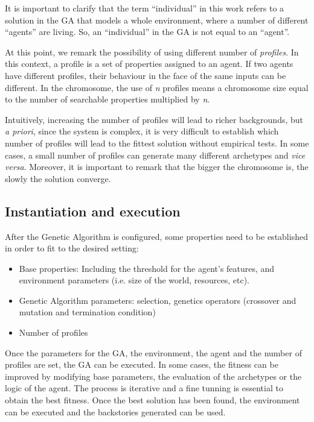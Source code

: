 \documentclass[letterpaper]{article}
\begin{document}
It is important to clarify that the term ``individual'' in this work refers to a solution in the GA that models a whole environment, where a number of different ``agents'' are living. So, an ``individual'' in the GA is not equal to an ``agent''.  


At this point, we remark the possibility of using different number of {\em profiles}. In this context, a profile is a set of properties assigned to an agent. If two agents have different profiles, their behaviour in the face of the same inputs can be different. In the chromosome, the use of \textit{n} profiles means a chromosome size equal to the number of searchable properties multiplied by \textit{n}.

Intuitively, increasing the number of profiles will lead to richer backgrounds, but \textit{a priori}, since the system is complex, it is very difficult to establish which number of profiles will lead to the fittest solution without empirical tests. In some cases, a small number of profiles can generate many different archetypes and \textit{vice versa}. Moreover, it is important to remark that the bigger the chromosome is, the slowly the solution converge.


\subsection{Instantiation and execution}

After the Genetic Algorithm is configured, some properties need to be established in order to fit to the desired setting:
\begin{itemize}
\item Base properties: Including the threshold for the agent's features, and environment parameters (i.e. size of the world, resources, etc).
\item Genetic Algorithm parameters: selection, genetics operators (crossover and mutation and termination condition)
\item Number of profiles
\end{itemize}

Once the parameters for the GA, the environment, the agent and the number of profiles are set, the GA can be executed. In some cases, the fitness can be improved by modifying base parameters, the evaluation of the archetypes or the logic of the agent. The process is iterative and a fine tunning is essential to obtain the best fitness. Once the best solution has been found, the environment can be executed and the backstories generated can be used.
\end{document}
